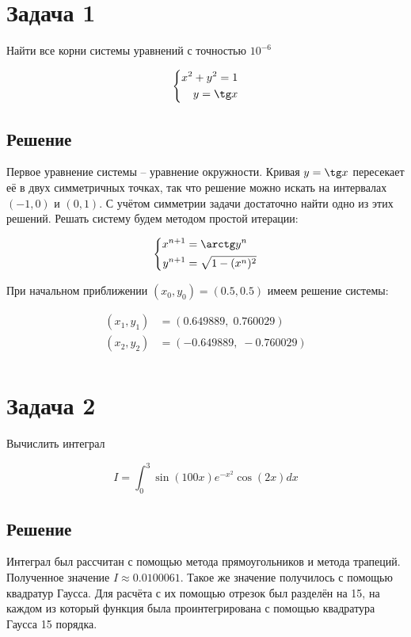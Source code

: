 \documentclass[a4paper,12pt]{article}
\begin{document}
\section*{Задача 1}

Найти все корни системы уравнений с точностью $10^{-6}$

\begin{equation*}
    \left\{
        \begin{aligned}
            x^2 + y^2 = 1 \\
            y = \tg x
        \end{aligned}
    \right.
\end{equation*}

\subsection*{Решение}

Первое уравнение системы -- уравнение окружности. Кривая $y = \tg x$ пересекает её в двух симметричных точках, так что решение можно искать на интервалах $(-1, 0)$ и $(0, 1)$. С учётом симметрии задачи достаточно найти одно из этих решений. Решать систему будем методом простой итерации:

\begin{equation*}
    \left\{
        \begin{aligned}
            x^{n + 1} &= \arctg y^n \\
            y^{n + 1} &= \sqrt{1 - (x^n)^2}
        \end{aligned}
    \right.
\end{equation*}

При начальном приближении $(x_0, y_0) = (0.5, 0.5)$ имеем решение системы:

\begin{align*}
    (x_1, y_1) &= (0.649889, \; 0.760029) \\
    (x_2, y_2) &= (-0.649889, \; -0.760029) \\
\end{align*}

\section*{Задача 2}

Вычислить интеграл

\begin{equation*}
    I = \int_0^3 \sin (100 x) e^{- x ^2} \cos (2 x) dx
\end{equation*}

\subsection*{Решение}

Интеграл был рассчитан с помощью метода прямоугольников и метода трапеций. Полученное значение $I \approx 0.0100061$. Такое же значение получилось с помощью квадратур Гаусса. Для расчёта с их помощью отрезок был разделён на 15, на каждом из который функция была проинтегрирована с помощью квадратура Гаусса 15 порядка.
\end{document}

